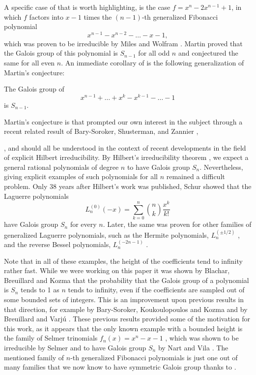 \documentclass[../main.tex]{subfiles}
\begin{document}
A specific case of  that is worth highlighting, is the case $f = x^n - 2x^{n-1} + 1$, in which $f$ factors into $x-1$ times the $\left( n-1 \right)$-th generalized {Fibonacci} polynomial
\[
  x^{n-1} - x^{n-2} - \ldots - x - 1,
\] 
which was proven to be irreducible by Miles \cite{Miles1960} and Wolfram \cite{Wolfram1998}.
Martin \cite{MARTIN2004213} proved that the Galois group of this polynomial is $S_{n-1}$ for all odd $n$ and conjectured the same for all even $n$.
An immediate corollary of  is the following generalization of Martin's conjecture:
\begin{corollary}
  \label{cor:generalized_fibonacci}
  The Galois group of 
  \[
    x^{n-1} + \ldots + x^k - x^{k-1} - \ldots - 1
  \]
  is $S_{n-1}$.
\end{corollary}
Martin's conjecture is that prompted our own interest in the subject through a recent related result of Bary-Soroker, Shusterman, and Zannier \cite[Appendix A]{Soroker_appendix_2017}, 

,  and  should all be understood in the context of recent developments in the field of explicit Hilbert irreducibility.
By Hilbert's irreducibility theorem \cite{Hilbert}, we expect a general rational polynomials of degree $n$ to have Galois group $S_n$.
Nevertheless, giving explicit examples of such polynomials for all $n$ remained a difficult problem.
Only 38 years after Hilbert's work was published, Schur \cite{schur1931affectless} showed that the Laguerre polynomials 
\[
  L_n^{\left( 0 \right)}\left( -x \right) = \sum_{k=0}^n \binom{n}{k} \frac{x^k}{k!}
\]
have Galois group $S_n$ for every $n$.
Later, the same was proven for other families of generalized Laguerre polynomials, such as the Hermite polynomials, $L^{\left( \pm 1/2 \right)}_n$ \cite{schur1931affectless}, and the reverse Bessel polynomials, $L^{\left( -2n-1 \right)}_n$ \cite{grosswald1978bessel} \cite{filaseta2002irreducibility}.

Note that in all of these examples, the height of the coefficients tend to infinity rather fast.
While we were working on this paper it was shown by Blachar, Breuillard and Kozma \cite{blachar2026galoisgroupsrandompolynomials} that the probability that the Galois group of a polynomial is $S_n$ tends to 1 as $n$ tends to infinity, even if the coefficients are sampled out of some bounded sets of integers. 
This is an improvement upon previous results in that direction, for example by Bary-Soroker, Koukoulopoulos and Kozma \cite{Bary_Soroker_2023} and by Breuillard and Varj\'{u} \cite{Breuillard_2019}.
These previous results provided some of the motivation for this work, as it appears that the only known example with a bounded height is the family of Selmer trinomials $f_n\left( x \right) = x^n - x - 1$ , which was shown to be irreducible by Selmer \cite{SelmerIrreducibility1956} and to have Galois group $S_n$ by Nart and Vila \cite{NartVila1979}. 
The mentioned family of $n$-th generalized Fibonacci polynomials is just one out of many families that we now know to have symmetric Galois group thanks to . 
\end{document}
